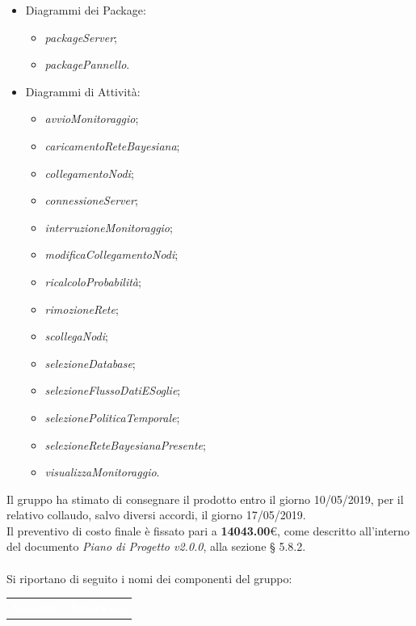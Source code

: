 \documentclass[11pt, a4paper]{letter} %
\begin{document}
\begin{letter}
\begin{itemize}
\begin{itemize}
			\end{itemize}
		\item Diagrammi dei Package:
			\begin{itemize}
				\item \textit{packageServer};
				\item \textit{packagePannello}.
			\end{itemize}
		\item Diagrammi di Attività: 
		\begin{itemize}
			\item \textit{avvioMonitoraggio};
			\item \textit{caricamentoReteBayesiana};
			\item \textit{collegamentoNodi};
			\item \textit{connessioneServer};
			\item \textit{interruzioneMonitoraggio};
			\item \textit{modificaCollegamentoNodi};
			\item \textit{ricalcoloProbabilità};
			\item \textit{rimozioneRete};
			\item \textit{scollegaNodi};
			\item \textit{selezioneDatabase};
			\item \textit{selezioneFlussoDatiESoglie};
			\item \textit{selezionePoliticaTemporale};
			\item \textit{selezioneReteBayesianaPresente};
			\item \textit{visualizzaMonitoraggio}.
		\end{itemize}
		\end{itemize}
		Il gruppo ha stimato di consegnare il prodotto entro il giorno 10/05/2019, per il relativo collaudo, salvo diversi accordi, il giorno 17/05/2019.\\  
		Il preventivo di costo finale è fissato pari a \textbf{14043.00}€, come descritto all'interno del documento \textit{Piano di Progetto v2.0.0}, alla sezione § 5.8.2.\\ %
		\-\\
		Si riportano di seguito i nomi dei componenti del gruppo:
		\begin{center}
			\begin{longtable}[c]{|m{}|m{}|} 
				\hline
				\rowcolor{bluelogo}\textbf{\textcolor{white}{Membro}}  & \textbf{\textcolor{white}{Matricola}}\\

\end{longtable}
\end{center}
\end{letter}
\end{document}
